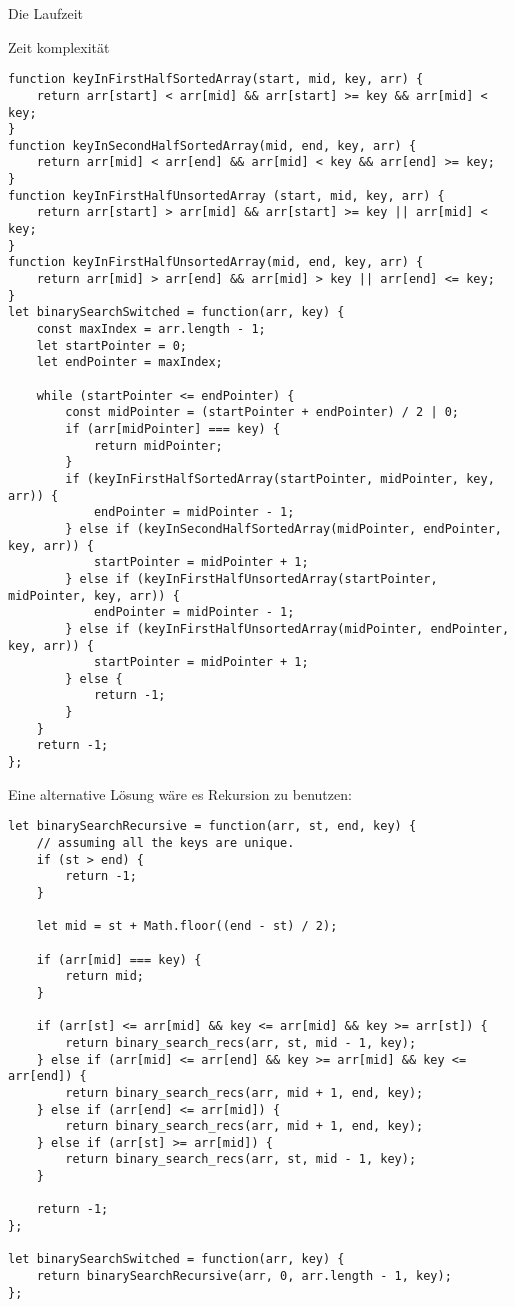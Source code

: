 \documentclass{book}
\begin{document}
Die Laufzeit

Zeit komplexität

\begin{lstlisting}[caption=My Javascript Example]
function keyInFirstHalfSortedArray(start, mid, key, arr) {
	return arr[start] < arr[mid] && arr[start] >= key && arr[mid] < key;
}
function keyInSecondHalfSortedArray(mid, end, key, arr) {
	return arr[mid] < arr[end] && arr[mid] < key && arr[end] >= key;
}
function keyInFirstHalfUnsortedArray (start, mid, key, arr) {
	return arr[start] > arr[mid] && arr[start] >= key || arr[mid] < key;
}
function keyInFirstHalfUnsortedArray(mid, end, key, arr) {
	return arr[mid] > arr[end] && arr[mid] > key || arr[end] <= key;
}
let binarySearchSwitched = function(arr, key) {
	const maxIndex = arr.length - 1;
	let startPointer = 0;
	let endPointer = maxIndex;

	while (startPointer <= endPointer) {
		const midPointer = (startPointer + endPointer) / 2 | 0;
		if (arr[midPointer] === key) {
			return midPointer;
		}
		if (keyInFirstHalfSortedArray(startPointer, midPointer, key, arr)) {
			endPointer = midPointer - 1;
		} else if (keyInSecondHalfSortedArray(midPointer, endPointer, key, arr)) {
			startPointer = midPointer + 1;
		} else if (keyInFirstHalfUnsortedArray(startPointer, midPointer, key, arr)) {
			endPointer = midPointer - 1;
		} else if (keyInFirstHalfUnsortedArray(midPointer, endPointer, key, arr)) {
			startPointer = midPointer + 1;
		} else {
			return -1;
		}
	}
	return -1;
};
\end{lstlisting}

Eine alternative Lösung wäre es Rekursion zu benutzen:
\begin{lstlisting}[caption=My Javascript Example]
let binarySearchRecursive = function(arr, st, end, key) {
	// assuming all the keys are unique.
	if (st > end) {
		return -1;
	}
	
	let mid = st + Math.floor((end - st) / 2);
	
	if (arr[mid] === key) {
		return mid;
	}
	
	if (arr[st] <= arr[mid] && key <= arr[mid] && key >= arr[st]) {
		return binary_search_recs(arr, st, mid - 1, key);
	} else if (arr[mid] <= arr[end] && key >= arr[mid] && key <= arr[end]) {
		return binary_search_recs(arr, mid + 1, end, key);
	} else if (arr[end] <= arr[mid]) {
		return binary_search_recs(arr, mid + 1, end, key);
	} else if (arr[st] >= arr[mid]) {
		return binary_search_recs(arr, st, mid - 1, key);
	} 
	
	return -1;
};

let binarySearchSwitched = function(arr, key) {
	return binarySearchRecursive(arr, 0, arr.length - 1, key);
};
\end{lstlisting}
\end{document}
